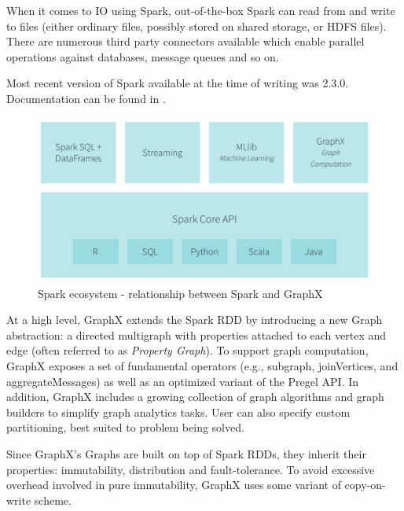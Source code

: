 \noindent
When it comes to IO using Spark, out-of-the-box Spark can read from and write to files (either ordinary files, possibly stored on shared storage, or HDFS files). There are numerous third party connectors available which enable parallel operations against databases, message queues and so on.

\noindent
Most recent version of Spark available at the time of writing was 2.3.0. Documentation can be found in \cite{spark-doc}.

\begin{figure}
    \centering
    \includegraphics[scale=0.2]{images/spark-ecosystem.jpg}
    \caption{Spark ecosystem - relationship between Spark and GraphX}
    \label{fig:spark-ecosystem}
\end{figure}

At a high level, GraphX extends the Spark RDD by introducing a new Graph abstraction: a directed multigraph with properties attached to each vertex and edge (often referred to as \textit{Property Graph}). To support graph computation, GraphX exposes a set of fundamental operators (e.g., subgraph, joinVertices, and aggregateMessages) as well as an optimized variant of the Pregel API. In addition, GraphX includes a growing collection of graph algorithms and graph builders to simplify graph analytics tasks. User can also specify custom partitioning, best suited to problem being solved.

\noindent
Since GraphX's Graphs are built on top of Spark RDDs, they inherit their properties: immutability, distribution and fault-tolerance. To avoid excessive overhead involved in pure immutability, GraphX uses some variant of copy-on-write scheme. 

